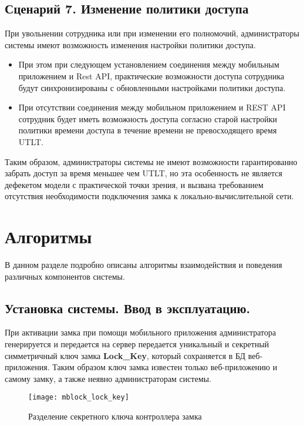 \subsection{Сценарий 7. Изменение политики доступа} \label{subsect2_3_7}

При увольнении сотрудника или при изменении его полномочий, администраторы системы имеют возможность изменения настройки политики доступа. 

\begin{itemize}
	\item При этом при следующем установлением соединения между мобильным приложением и Rest API, практические возможности доступа сотрудника будут синхронизированы с обновленными настройками политики доступа.
	\item При отсутствии соединения между мобильном приложением и REST API сотрудник будет иметь возможность доступа согласно старой настройки политики времени доступа в течение времени не превосходящего время UTLT.
\end{itemize}

Таким образом, администраторы системы не имеют возможности гарантированно забрать доступ за время меньшее чем UTLT, но эта особенность не является дефекетом модели с практической точки зрения, и вызвана требованием отсутствия необходимости подключения замка к локально-вычислительной сети.

\section{Алгоритмы}	\label{sect2_4}

В данном разделе подробно описаны алгоритмы взаимодействия и поведения различных компонентов системы.

\subsection{Установка системы. Ввод в эксплуатацию.} \label{subsect2_4_1}

При активации замка при помощи мобильного приложения администратора генерируется и передается на сервер передается уникальный и секретный симметричный ключ замка \textbf{Lock\_Key}, который сохраняется в БД веб-приложения. Таким образом ключ замка известен только веб-приложению и самому замку, а также неявно администраторам системы.

\begin{figure}[ht] %
	\centering
	\texttt{[image: mblock\_lock\_key]}\\ %
	\caption{Разделение секретного ключа контроллера замка}%
	\label{mblock_lock_key}%
\end{figure}

